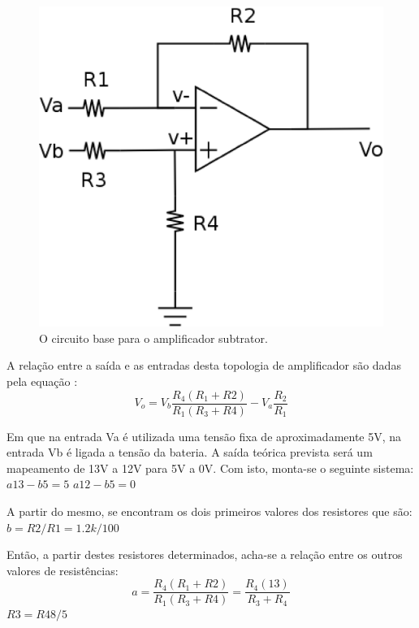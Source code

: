 \begin{figure}[h]
	\centering
	\includegraphics[keepaspectratio=true,scale=0.35]{figuras/amplif_sub_topo}
	\caption{ O circuito base para o amplificador subtrator.}
	\label{amplif_sub}
\end{figure}

\pagebreak

A relação entre a saída e as entradas desta topologia de amplificador são dadas pela equação	:
\begin{equation}
\label{div1}
V_{o}=V_{b}\frac{R_{4}(R_{1}+R{2})}{R_{1}(R_{3}+R{4})}-V_{a}\frac{R_{2}}{R_{1}}
\end{equation}

Em que na entrada Va é utilizada uma tensão fixa de aproximadamente 5V, na entrada Vb é ligada a tensão da bateria. A saída teórica prevista será um mapeamento de 13V a 12V para 5V a 0V. Com isto, monta-se o seguinte sistema:
$a13-b5 = 5$
$a12-b5 = 0$

A partir do mesmo, se encontram os dois primeiros valores dos resistores que são:
$b = R2/R1 = 1.2k/100$

Então, a partir destes resistores determinados, acha-se a relação entre os outros valores de resistências:
\begin{equation}
\label{div2}
a=\frac{R_{4}(R_{1}+R{2})}{R_{1}(R_{3}+R{4})}=\frac{R_{4}(13)}{R_{3}+R_{4}}
\end{equation}
$R3 = R4 8/5$

